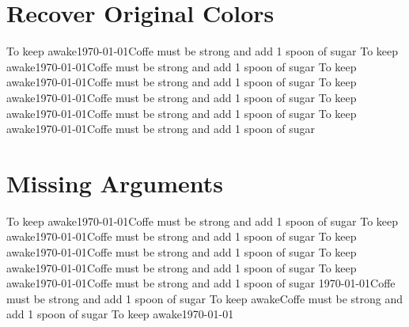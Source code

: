 \documentclass[12pt,a4paper]{article}
\begin{document}
\section{Recover Original Colors}
%
{To keep awake}{\today}{Coffe must be strong and add 1 spoon of sugar}
%
{To keep awake}{\today}{Coffe must be strong and add 1 spoon of sugar}
%
{To keep awake}{\today}{Coffe must be strong and add 1 spoon of sugar}
%
{To keep awake}{\today}{Coffe must be strong and add 1 spoon of sugar}
%
{To keep awake}{\today}{Coffe must be strong and add 1 spoon of sugar}
%
{To keep awake}{\today}{Coffe must be strong and add 1 spoon of sugar}

\section{Missing Arguments}
%
{To keep awake}{\today}{Coffe must be strong and add 1 spoon of sugar}
%
{To keep awake}{\today}{Coffe must be strong and add 1 spoon of sugar}
%
{To keep awake}{\today}{Coffe must be strong and add 1 spoon of sugar}
%
{To keep awake}{\today}{Coffe must be strong and add 1 spoon of sugar}
%
{To keep awake}{\today}{Coffe must be strong and add 1 spoon of sugar}
%
{}{\today}{Coffe must be strong and add 1 spoon of sugar}
%
{To keep awake}{}{Coffe must be strong and add 1 spoon of sugar}
%
{To keep awake}{\today}{}

\newpage
\setlength{\cfttasksnumwidth}{20pt}
\newpage
\listoftasks
\end{document}
